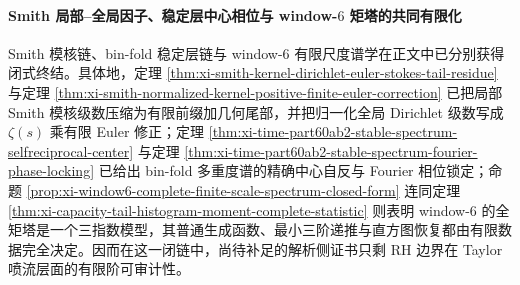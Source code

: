 \paragraph{Smith 局部--全局因子、稳定层中心相位与 window-\texorpdfstring{$6$}{6} 矩塔的共同有限化}
Smith 模核链、bin-fold 稳定层链与 window-\(6\) 有限尺度谱学在正文中已分别获得闭式终结。具体地，定理 \ref{thm:xi-smith-kernel-dirichlet-euler-stokes-tail-residue} 与定理 \ref{thm:xi-smith-normalized-kernel-positive-finite-euler-correction} 已把局部 Smith 模核级数压缩为有限前缀加几何尾部，并把归一化全局 Dirichlet 级数写成 \(\zeta(s)\) 乘有限 Euler 修正；定理 \ref{thm:xi-time-part60ab2-stable-spectrum-selfreciprocal-center} 与定理 \ref{thm:xi-time-part60ab2-stable-spectrum-fourier-phase-locking} 已给出 bin-fold 多重度谱的精确中心自反与 Fourier 相位锁定；命题 \ref{prop:xi-window6-complete-finite-scale-spectrum-closed-form} 连同定理 \ref{thm:xi-capacity-tail-histogram-moment-complete-statistic} 则表明 window-\(6\) 的全矩塔是一个三指数模型，其普通生成函数、最小三阶递推与直方图恢复都由有限数据完全决定。因而在这一闭链中，尚待补足的解析侧证书只剩 RH 边界在 Taylor 喷流层面的有限阶可审计性。


